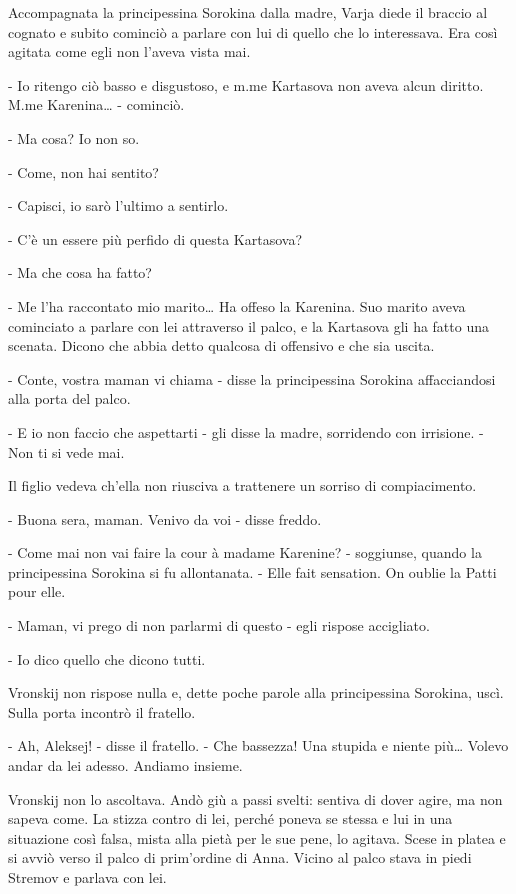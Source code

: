 Accompagnata la principessina Sorokina dalla madre, Varja diede il braccio al cognato e subito cominciò a parlare con lui di quello che lo interessava. Era così agitata come egli non l'aveva vista mai. 

- Io ritengo ciò basso e disgustoso, e m.me Kartasova non aveva alcun diritto. M.me Karenina\ldots{} - cominciò. 

- Ma cosa? Io non so. 

- Come, non hai sentito? 

- Capisci, io sarò l'ultimo a sentirlo. 

- C'è un essere più perfido di questa Kartasova? 

- Ma che cosa ha fatto? 

- Me l'ha raccontato mio marito\ldots{} Ha offeso la Karenina. Suo marito aveva cominciato a parlare con lei attraverso il palco, e la Kartasova gli ha fatto una scenata. Dicono che abbia detto qualcosa di offensivo e che sia uscita. 

- Conte, vostra maman vi chiama - disse la principessina Sorokina affacciandosi alla porta del palco. 

- E io non faccio che aspettarti - gli disse la madre, sorridendo con irrisione. - Non ti si vede mai. 

Il figlio vedeva ch'ella non riusciva a trattenere un sorriso di compiacimento. 

- Buona sera, maman. Venivo da voi - disse freddo. 

- Come mai non vai faire la cour à madame Karenine? - soggiunse, quando la principessina Sorokina si fu allontanata. - Elle fait sensation. On oublie la Patti pour elle. 

- Maman, vi prego di non parlarmi di questo - egli rispose accigliato. 

- Io dico quello che dicono tutti. 

Vronskij non rispose nulla e, dette poche parole alla principessina Sorokina, uscì. Sulla porta incontrò il fratello. 

- Ah, Aleksej! - disse il fratello. - Che bassezza! Una stupida e niente più\ldots{} Volevo andar da lei adesso. Andiamo insieme. 

Vronskij non lo ascoltava. Andò giù a passi svelti: sentiva di dover agire, ma non sapeva come. La stizza contro di lei, perché poneva se stessa e lui in una situazione così falsa, mista alla pietà per le sue pene, lo agitava. Scese in platea e si avviò verso il palco di prim'ordine di Anna. Vicino al palco stava in piedi Stremov e parlava con lei. 

